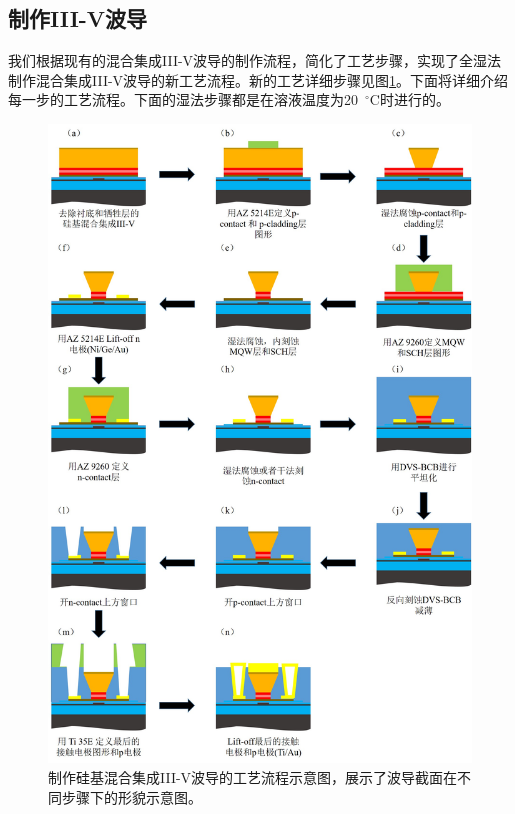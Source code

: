 \subsection{制作III-V波导}
我们根据现有的混合集成III-V波导的制作流程\cite{roelkens2015iii}，简化了工艺步骤，实现了全湿法制作混合集成III-V波导的新工艺流程。新的工艺详细步骤见图\ref{chapt4_III_V_wg_process}。下面将详细介绍每一步的工艺流程。下面的湿法步骤都是在溶液温度为20~$^{\circ}$C时进行的。
\begin{figure}[!h]
	\centering
	\includegraphics[width=14cm]{./Pictures/chapt4_III_V_wg_process.jpg}
	\caption{制作硅基混合集成III-V波导的工艺流程示意图，展示了波导截面在不同步骤下的形貌示意图。}
	\label{chapt4_III_V_wg_process}
\end{figure}

